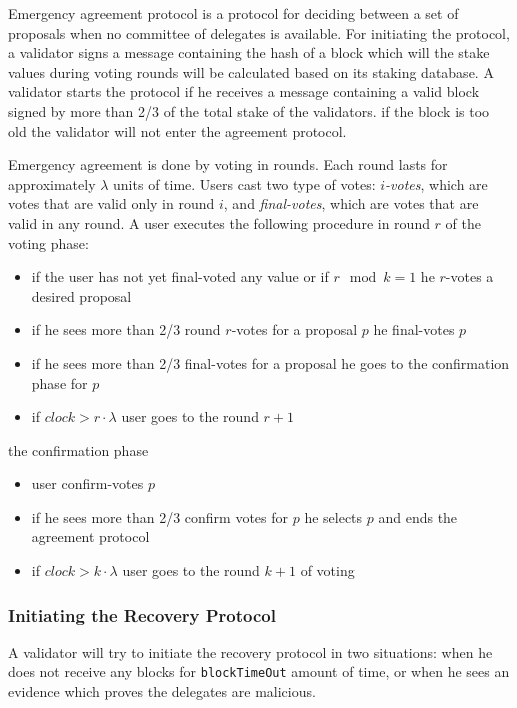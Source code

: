 Emergency agreement protocol is a protocol for deciding between a set of proposals when no committee of
delegates is available. For initiating the protocol, a validator signs a message containing
the hash of a block which will the stake values during voting rounds will be calculated based on its
staking database. A validator starts the protocol if he
receives a message containing a valid block signed by more than 2/3 of the total stake of the validators.
if the block is too old the validator will not enter the agreement protocol.

Emergency agreement is done by voting in rounds. Each round lasts for approximately $\lambda$ units of time.
Users cast two type of votes: \emph{$i$-votes}, which are votes that are valid only in round $i$,
and \emph{final-votes}, which are votes that are valid in any round. A user executes the
following procedure in round $r$ of the voting phase:
\begin{itemize}
    \item if the user has not yet final-voted any value or if $r\mod k = 1$ he $r$-votes a desired proposal
    \item if he sees more than 2/3 round $r$-votes for a proposal $p$ he final-votes $p$
    \item if he sees more than 2/3 final-votes for a proposal he goes to the confirmation phase for $p$
    \item if $clock > r \cdot \lambda$ user goes to the round $r + 1$
\end{itemize}

the confirmation phase
\begin{itemize}
    \item user confirm-votes $p$
    \item if he sees more than 2/3 confirm votes for $p$ he selects $p$ and ends the agreement protocol
    \item if $clock > k \cdot \lambda$ user goes to the round $k + 1$ of voting
\end{itemize}

\subsubsection{Initiating the Recovery Protocol}

A validator will try to initiate the recovery protocol in two situations: when he does not receive any blocks for
\texttt{blockTimeOut} amount of time, or when he sees an evidence which proves the delegates are malicious.


